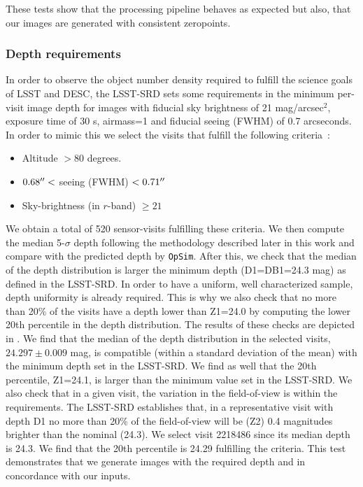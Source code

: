 \documentclass[twocolumn]{aastex62}
\begin{document}
These tests show that the processing pipeline behaves as expected but also, that our images are generated with consistent zeropoints.

\subsubsection{Depth requirements}
\label{sssec:depth}
In order to observe the object number density required to fulfill the science goals of LSST and DESC, the LSST-SRD sets some requirements in the minimum per-visit image depth for images with fiducial sky brightness of 21 mag/arcsec$^2$, exposure time of 30 s, airmass=1 and fiducial seeing (FWHM) of 0.7 arcseconds. In order to mimic this we select the visits that fulfill the following criteria~\citep{LPM-17}:
\begin{itemize}
\item Altitude $> 80$ degrees.
\item $0.68\mbox{$^{\prime\prime}$} <$ seeing (FWHM) $ < 0.71\mbox{$^{\prime\prime}$}$
\item Sky-brightness (in $r$-band) $ \geq 21$ 
\end{itemize}
We obtain a total of 520 sensor-visits fulfilling these criteria. We then compute the median 5-$\sigma$ depth following the methodology described later in this work and compare with the predicted depth by \texttt{OpSim}. After this, we check that the median of the depth distribution is larger the minimum depth (D1=DB1=24.3 mag) as defined in the LSST-SRD. In order to have a uniform, well characterized sample, depth uniformity is already required. This is why we also check that no more than 20\% of the visits have a depth lower than Z1=24.0 by computing the lower 20th percentile in the depth distribution. The results of these checks are depicted in . We find that the median of the depth distribution in the selected visits, $24.297 \pm 0.009$ mag, is compatible (within a standard deviation of the mean) with the minimum depth set in the LSST-SRD. We find as well that the 20th percentile, Z1=24.1, is larger than the minimum value set in the LSST-SRD. We also check that in a given visit, the variation in the field-of-view is within the requirements. The LSST-SRD establishes that, in a representative visit with depth D1 no more than 20\% of the field-of-view will be (Z2) 0.4 magnitudes brighter than the nominal (24.3). We select visit 2218486 since its median depth is 24.3. We find that the 20th percentile is 24.29 fulfilling the criteria. This test demonstrates that we generate images with the required depth and in concordance with our inputs.
\end{document}
